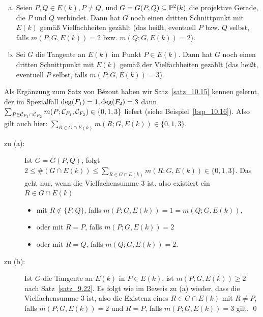 \begin{satz}
\label{satz_13.1}
	\begin{enumerate}[(a)]
		\item Seien $P,Q \in E(k), P \neq Q$, und $G=G(P,Q) \subseteq \mathbb{P}^2(k)$ die projektive Gerade, die $P$ und $Q$ verbindet. Dann hat $G$ noch einen dritten Schnittpunkt mit $E(k)$ gemäß Vielfachheiten gezählt (das heißt, eventuell $P$ bzw. $Q$ selbst, falls $m(P;G,E(k)) = 2$ bzw. $m(Q;G,E(k)) = 2$).
		\item Sei $G$ die Tangente an $E(k)$ im Punkt $P \in E(k)$. Dann hat $G$ noch einen dritten Schnittpunkt mit $E(k)$ gemäß der Vielfachheiten gezählt (das heißt, eventuell $P$ selbst, falls $m(P;G,E(k)) = 3$).
	\end{enumerate}
\end{satz}

\begin{bew}
	Als Ergänzung zum Satz von Bézout haben wir Satz~\ref{satz_10.15} kennen gelernt, der im Spezialfall $\deg(F_1) = 1,\linebreak \deg(F_2) = 3$ dann $\sum_{P \in \mathcal{C}_{F_1} \cap \mathcal{C}_{F_2}} m(P;\mathcal{C}_{F_1},\mathcal{C}_{F_2}) \in \{0,1,3\}$ liefert (siehe Beispiel~\ref{bsp_10.16}). Also gilt auch hier: \linebreak $\sum_{R \in G \cap E(k)} m(R;G,E(k)) \in \{0,1,3\}$.
	\begin{description}
		\item[zu (a):] Ist $G = G(P,Q)$, folgt $2 \leq  \#(G \cap E(k)) \leq \sum_{R \in G \cap E(k)} m(R;G,E(k)) \in \{0,1,3\}$. Das geht nur, wenn die Vielfachensumme $3$ ist, also existiert ein $R \in G \cap E(k)$ \begin{itemize}
			\item mit $R \notin \{P,Q\}$, falls $m(P;G,E(k)) = 1 = m(Q;G,E(k))$,
			\item oder mit $R = P$, falls $m(P;G,E(k)) = 2$
			\item oder mit $R = Q$, falls $m(Q;G,E(k)) = 2$.
		\end{itemize} 
		\item[zu (b):] Ist $G$ die Tangente an $E(k)$ in $P \in E(k)$, ist $m(P;G,E(k)) \geq 2$ nach Satz~\ref{satz_9.22}. Es folgt wie im Beweis zu (a) wieder, dass die Vielfachensumme $3$ ist, also die Existenz eines $R \in G \cap E(k)$ mit $R \neq P$, falls $m(P;G,E(k)) = 2$ und $R = P$, falls $m(P;G,E(k)) = 3$ gilt. \qed
	\end{description}
\end{bew}

